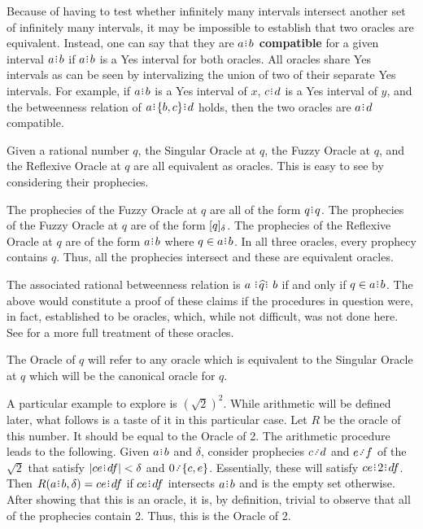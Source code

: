 \documentclass[12pt]{article}
\begin{document}
Because of having to test whether infinitely many intervals intersect another set of infinitely many intervals, it may be impossible to establish that two oracles are equivalent. Instead, one can say that they are \textbf{$a\rint b$ compatible} for a given interval $a\rint b$ if $a\rint b$ is a Yes interval for both oracles. All oracles share Yes intervals as can be seen by intervalizing the union of two of their separate Yes intervals. For example, if $a\rint b$ is a Yes interval of $x$, $c\rint d$ is a Yes interval of $y$, and the betweenness relation of $a\rint \{b,c\}\rint d$ holds, then the two oracles are $a\rint d$ compatible.  


 Given a rational number $q$, the Singular Oracle at $q$, the Fuzzy Oracle at $q$, and the Reflexive Oracle at $q$ are all equivalent as oracles. This is easy to see by considering their prophecies. 
 
 The prophecies of the Fuzzy Oracle at $q$ are all of the form $q\rint q$. The prophecies of the Fuzzy Oracle at $q$ are of the form $[q]_{\delta}$. The prophecies of the Reflexive Oracle at $q$ are of the form $a\rint b$ where $q \in a\rint b$. In all three oracles, every prophecy contains $q$. Thus, all the prophecies intersect and these are equivalent oracles. 

The associated rational betweenness relation is $a \xora[q] b$ if and only if $q \in a\rint b$. The above would constitute a proof of these claims if the procedures in question were, in fact, established to be oracles, which, while not difficult, was not done here. See \cite{taylor23main} for a more full treatment of these oracles. 

The Oracle of $q$ will refer to any oracle which is equivalent to the Singular Oracle at $q$ which will be the canonical oracle for $q$. 

A particular example to explore is $(\sqrt{2})^2$. While arithmetic will be defined later, what follows is a taste of it in this particular case. Let $R$ be the oracle of this number. It should be equal to the Oracle of 2. The arithmetic procedure leads to the following. Given $a\rint b$ and $\delta$, consider prophecies $c\lte d$ and $e\lte f$ of the $\sqrt{2}$ that satisfy $|ce\rint df| < \delta$ and $0\lte \{c,e\}$. Essentially, these will satisfy  $ce\rint 2\rint df$. Then $R(a\rint b, \delta) = ce\rint df$ if $ce\rint df$ intersects $a\rint b$ and is the empty set otherwise. After showing that this is an oracle, it is, by definition, trivial to observe that all of the prophecies contain 2. Thus, this is the Oracle of 2. 
\end{document}
